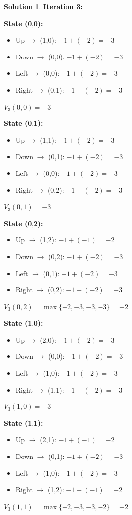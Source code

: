 \documentclass[11pt]{article}
\theoremstyle{definition}
\newtheorem*{solution}{Solution}
\begin{document}
\begin{solution}
\textbf{Iteration 3:}

\textbf{State (0,0):}
\begin{itemize}
    \item Up $\to$ (1,0): $-1 + (-2) = -3$
    \item Down $\to$ (0,0): $-1 + (-2) = -3$
    \item Left $\to$ (0,0): $-1 + (-2) = -3$
    \item Right $\to$ (0,1): $-1 + (-2) = -3$
\end{itemize}
$V_3(0,0) = -3$

\textbf{State (0,1):}
\begin{itemize}
    \item Up $\to$ (1,1): $-1 + (-2) = -3$
    \item Down $\to$ (0,1): $-1 + (-2) = -3$
    \item Left $\to$ (0,0): $-1 + (-2) = -3$
    \item Right $\to$ (0,2): $-1 + (-2) = -3$
\end{itemize}
$V_3(0,1) = -3$

\textbf{State (0,2):}
\begin{itemize}
    \item Up $\to$ (1,2): $-1 + (-1) = -2$
    \item Down $\to$ (0,2): $-1 + (-2) = -3$
    \item Left $\to$ (0,1): $-1 + (-2) = -3$
    \item Right $\to$ (0,2): $-1 + (-2) = -3$
\end{itemize}
$V_3(0,2) = \max\{-2, -3, -3, -3\} = -2$

\textbf{State (1,0):}
\begin{itemize}
    \item Up $\to$ (2,0): $-1 + (-2) = -3$
    \item Down $\to$ (0,0): $-1 + (-2) = -3$
    \item Left $\to$ (1,0): $-1 + (-2) = -3$
    \item Right $\to$ (1,1): $-1 + (-2) = -3$
\end{itemize}
$V_3(1,0) = -3$

\textbf{State (1,1):}
\begin{itemize}
    \item Up $\to$ (2,1): $-1 + (-1) = -2$
    \item Down $\to$ (0,1): $-1 + (-2) = -3$
    \item Left $\to$ (1,0): $-1 + (-2) = -3$
    \item Right $\to$ (1,2): $-1 + (-1) = -2$
\end{itemize}
$V_3(1,1) = \max\{-2, -3, -3, -2\} = -2$


\end{solution}
\end{document}
